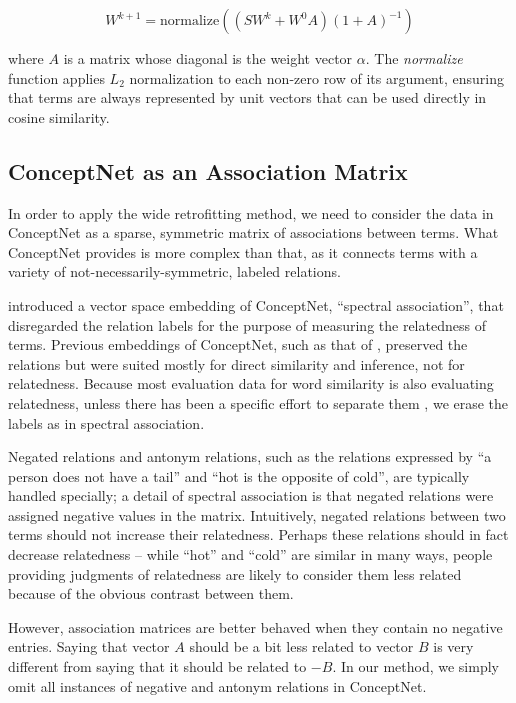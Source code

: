 \documentclass[11pt,letterpaper]{article}
\begin{document}
$$
W^{k+1} = \mathrm{normalize}\left( \left( S W^k + W^0 A \right)\left( 1 + A \right)^{-1} \right)
$$

where $A$ is a matrix whose diagonal is the weight vector $\alpha$. The {\em normalize}
function applies $L_2$ normalization to each non-zero row of its argument, ensuring
that terms are always represented by unit vectors that can be used directly in
cosine similarity.

\subsection{ConceptNet as an Association Matrix}

In order to apply the wide retrofitting method, we need to consider the data in
ConceptNet as a sparse, symmetric matrix of associations between terms. What
ConceptNet provides is more complex than that, as it connects terms with a
variety of not-necessarily-symmetric, labeled relations.

 introduced a vector space embedding of ConceptNet,
``spectral association'', that disregarded the relation labels for the purpose
of measuring the relatedness of terms. Previous embeddings of ConceptNet, such
as that of , preserved the relations but were
suited mostly for direct similarity and inference, not for relatedness. Because
most evaluation data for word similarity is also evaluating relatedness, unless
there has been a specific effort to separate them \cite{agirre2009similarity},
we erase the labels as in spectral association.

Negated relations and antonym relations, such as the relations expressed by
``a person does not have a tail'' and ``hot is the opposite of cold'', are
typically handled specially; a detail of spectral association is that negated
relations were assigned negative values in the matrix. Intuitively, negated
relations between two terms should not increase their relatedness. Perhaps
these relations should in fact decrease relatedness -- while ``hot'' and
``cold'' are similar in many ways, people providing judgments of relatedness
are likely to consider them less related because of the obvious contrast
between them.

However, association matrices are better behaved when they contain no negative
entries. Saying that vector $A$ should be a bit less related to vector
$B$ is very different from saying that it should be related to $-B$.
In our method, we simply omit all instances of negative and antonym
relations in ConceptNet.
\end{document}
